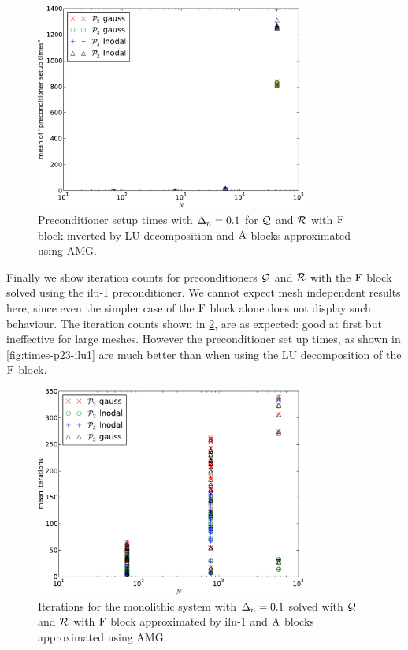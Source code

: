 \begin{figure}
  \centering
  \includegraphics[width=0.8\textwidth]{plots/linear_solvers_p2p3/implicitexact-meanofpreconditionersetuptimesvsinitialnnode.pdf}
  \caption{Preconditioner setup times with $\Delta_{n}=0.1$ for $\mathcal{Q}$ and $\mathcal{R}$ with $\mathrm{F}$ block inverted by LU decomposition and $\mathrm{A}$ blocks approximated using AMG.}
  \label{fig:times-p23-exact}
\end{figure}


Finally we show iteration counts for preconditioners $\mathcal{Q}$ and $\mathcal{R}$ with the $\mathrm{F}$ block solved using the ilu-1 preconditioner.
We cannot expect mesh independent results here, since even the simpler case of the $\mathrm{F}$ block alone does not display such behaviour.
The iteration counts shown in \cref{fig:its-p23-ilu1}, are as expected: good at first but ineffective for large meshes.
However the preconditioner set up times, as shown in \cref{fig:times-p23-ilu1} are much better than when using the LU decomposition of the $\mathrm{F}$ block.

\begin{figure}
  \centering
  \includegraphics[width=0.8\textwidth]{plots/linear_solvers_p2p3/implicitilu-1-meanofnsolveritersvsinitialnnode.pdf}
  \caption{Iterations for the monolithic system with $\Delta_{n}=0.1$ solved with $\mathcal{Q}$ and $\mathcal{R}$ with $\mathrm{F}$ block approximated by ilu-1 and $\mathrm{A}$ blocks approximated using AMG.}
  \label{fig:its-p23-ilu1}
\end{figure}

